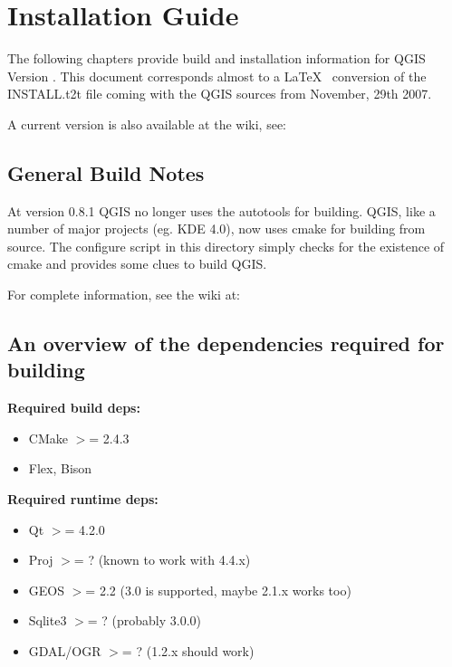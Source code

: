 \section{Installation Guide}\label{label_install}

\updatedisclaimer

The following chapters provide build and installation information for QGIS 
Version \CURRENT. This document corresponds almost to a \LaTeX~ conversion of 
the INSTALL.t2t file coming with the QGIS sources from November, 29th 2007.

A current version is also available at the wiki, see:

\subsection{General Build Notes}

At version 0.8.1 QGIS no longer uses the autotools for building. QGIS, like a
number of major projects (eg. KDE 4.0), now uses cmake for building from
source. The configure script in this directory simply checks for the existence
of cmake and provides some clues to build QGIS.

For complete information, see the wiki at:

\subsection{An overview of the dependencies required for building}

\textbf{Required build deps:}

\begin {itemize}
\item CMake $>$= 2.4.3
\item Flex, Bison
\end{itemize}

\textbf{Required runtime deps:}

\begin {itemize}
\item Qt $>$= 4.2.0
\item Proj $>$= ? (known to work with 4.4.x)
\item GEOS $>$= 2.2 (3.0 is supported, maybe 2.1.x works too)
\item Sqlite3 $>$= ? (probably 3.0.0)
\item GDAL/OGR $>$= ? (1.2.x should work)
\end{itemize}

